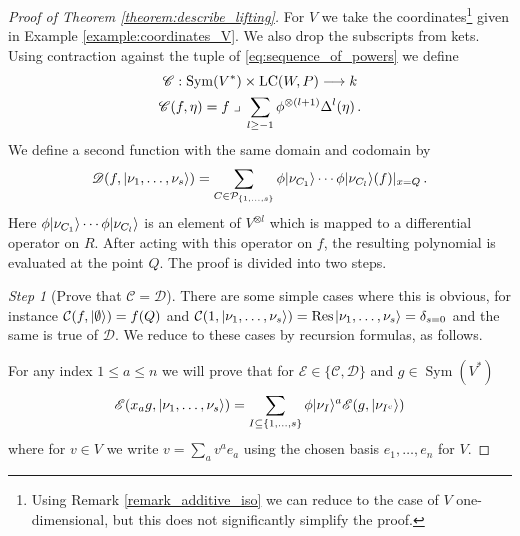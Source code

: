 \documentclass[english,letter paper,12pt,reqno]{article}
\DeclarePairedDelimiter\ket{\lvert}{\rangle}
\theoremstyle{example}
\numberwithin{equation}{section}
\def\vacu{\ket{\emptyset}}
\DeclareMathOperator{\Sym}{Sym}
\DeclareMathOperator{\LC}{LC}
\begin{document}
\begin{proof}[Proof of Theorem \ref{theorem:describe_lifting}] For $V$ we take the coordinates\footnote{Using Remark \ref{remark_additive_iso} we can reduce to the case of $V$ one-dimensional, but this does not significantly simplify the proof.} given in Example \ref{example:coordinates_V}. We also drop the subscripts from kets. Using contraction against the tuple of \eqref{eq:sequence_of_powers} we define
\begin{gather*}
\mathscr{C}: \Sym(V^*) \times \LC( W, P ) \lto k\\
\mathscr{C}(f, \eta) = f \; \lrcorner \; \sum_{l \ge -1} \phi^{\otimes (l+1)} \Delta^l( \eta )\,.
\end{gather*}
We define a second function with the same domain and codomain by
\[
\mathscr{D}(f, \ket{\nu_1, \ldots, \nu_s}) = \sum_{C \in \cat{P}_{\{1,\ldots,s\}}} \phi \ket{\nu_{C_1}} \cdots \phi \ket{\nu_{C_l}}(f)\arrowvert_{x = Q}\,.
\]
Here $\phi \ket{\nu_{C_1}} \cdots \phi \ket{\nu_{C_l}}$ is an element of $V^{\otimes l}$ which is mapped to a differential operator on $R$. After acting with this operator on $f$, the resulting polynomial is evaluated at the point $Q$. The proof is divided into two steps.

\emph{Step 1} (Prove that $\mathscr{C} = \mathscr{D}$). There are some simple cases where this is obvious, for instance $\cat{C}(f, \vacu) = f( Q )$ and $\cat{C}( 1, \ket{\nu_1,\ldots,\nu_s} ) = \Res\;\ket{\nu_1,\ldots,\nu_s} = \delta_{s = 0}$ and the same is true of $\mathscr{D}$. We reduce to these cases by recursion formulas, as follows.

For any index $1 \le a \le n$ we will prove that for $\mathscr{E} \in \{ \mathscr{C}, \mathscr{D} \}$ and $g \in \Sym(V^*)$
\begin{equation}\label{eq:recur_formula}
\mathscr{E}( x_a g, \ket{\nu_1,\ldots,\nu_s} ) = \sum_{I \subseteq \{ 1,\ldots,s\}} \phi\ket{\nu_I}^a \mathscr{E}( g, \ket{\nu_{I^c}})
\end{equation}
where for $v \in V$ we write $v = \sum_a v^a e_a$ using the chosen basis $e_1,\ldots,e_n$ for $V$.


\end{proof}
\end{document}
